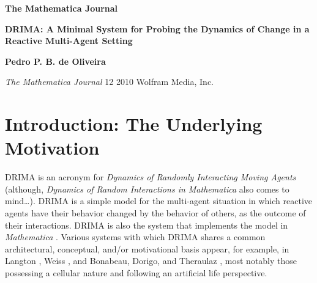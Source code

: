\documentclass[11pt, a4paper]{article}
\begin{document}
\begin{titlepage}
\noindent
\textbf{\large The Mathematica\textregistered{} Journal}\\[2em]

{\LARGE \textbf{DRIMA: A Minimal System for Probing the Dynamics of Change in a Reactive Multi-Agent Setting}\par}
\vspace{1.5em}
{\large \textbf{Pedro P. B. de Oliveira}\par}
\vspace{2em}

\begin{abstract}
\noindent
DRIMA is a simple cellular model for the multi-agent setting in which reactive agents have their behavior changed by the behavior of others, as the outcome of their interactions; it is also the system that implements the model in \textit{Mathematica}. It was conceived as a metaphor for the high-level issue of how agents ``attract'' others toward them, be it in the form of a change in any behavioral or conceptual orientation, habit, thinking, etc. This is modeled through a single behavior of the agents, which is their movement on a two-dimensional grid; as they move, they undergo interactions with each other that modify the way they move before and after the interaction. The focus of the model is on addressing issues related to the emergent dynamics of a particular setting, much in tune with an artificial life or complex systems perspective. DRIMA is purposefully meant to be simple and non-general, a minimal system for the kind of question it is designed to help address. The article is a presentation of the model and of key aspects of its implementation, not a discussion on its use to address any particular question.
\end{abstract}

\vfill
\noindent
\footnotesize \textit{The Mathematica Journal} 12 \textcopyright{} 2010 Wolfram Media, Inc.
\end{titlepage}

\section{Introduction: The Underlying Motivation}

DRIMA is an acronym for \textit{Dynamics of Randomly Interacting Moving Agents} (although, \textit{Dynamics of Random Interactions in Mathematica} also comes to mind\dots). DRIMA is a simple model for the multi-agent situation in which reactive agents have their behavior changed by the behavior of others, as the outcome of their interactions. DRIMA is also the system that implements the model in \textit{Mathematica} \cite{ref1}. Various systems with which DRIMA shares a common architectural, conceptual, and/or motivational basis appear, for example, in Langton \cite{ref2}, Weiss \cite{ref3}, and Bonabeau, Dorigo, and Theraulaz \cite{ref4}, most notably those possessing a cellular nature and following an artificial life perspective.
\end{document}
